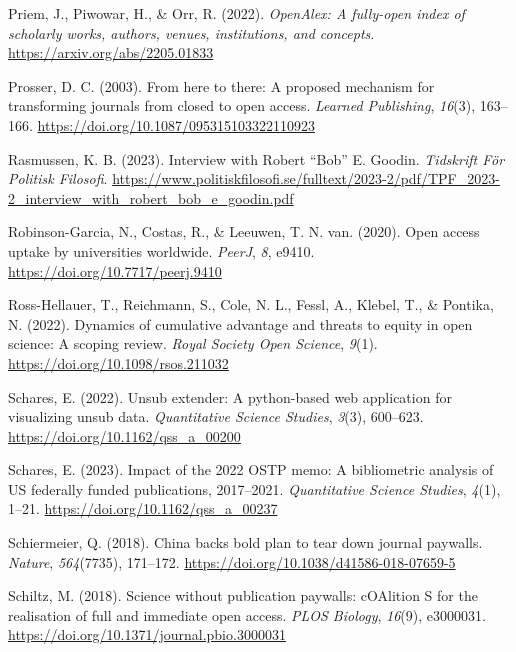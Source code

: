 \documentclass[a4paper,man,floatsintext,longtable,noextraspace,12pt]{apa6}
\newlength{\cslhangindent}
\newenvironment{CSLReferences}[2] %
  {\begin{list}{}{%
   \setlength{\itemindent}{0pt}
   \setlength{\leftmargin}{0pt}
   \setlength{\parsep}{0pt}
   \ifodd #1
    \setlength{\leftmargin}{\cslhangindent}
    \setlength{\itemindent}{-1\cslhangindent}
   \fi
   \setlength{\itemsep}{#2\baselineskip}}}
  {\end{list}}
\begin{document}
\begin{CSLReferences}{1}{0}
Priem, J., Piwowar, H., \& Orr, R. (2022). \emph{OpenAlex: A fully-open
index of scholarly works, authors, venues, institutions, and concepts}.
\url{https://arxiv.org/abs/2205.01833}

Prosser, D. C. (2003). From here to there: A proposed mechanism for
transforming journals from closed to open access. \emph{Learned
Publishing}, \emph{16}(3), 163--166.
\url{https://doi.org/10.1087/095315103322110923}

Rasmussen, K. B. (2023). Interview with {Robert {``Bob''} E. Goodin}.
\emph{Tidskrift För Politisk Filosofi}.
\url{https://www.politiskfilosofi.se/fulltext/2023-2/pdf/TPF_2023-2_interview_with_robert_bob_e_goodin.pdf}

Robinson-Garcia, N., Costas, R., \& Leeuwen, T. N. van. (2020). Open
access uptake by universities worldwide. \emph{{PeerJ}}, \emph{8},
e9410. \url{https://doi.org/10.7717/peerj.9410}

Ross-Hellauer, T., Reichmann, S., Cole, N. L., Fessl, A., Klebel, T., \&
Pontika, N. (2022). Dynamics of cumulative advantage and threats to
equity in open science: A scoping review. \emph{Royal Society Open
Science}, \emph{9}(1). \url{https://doi.org/10.1098/rsos.211032}

Schares, E. (2022). Unsub extender: A python-based web application for
visualizing unsub data. \emph{Quantitative Science Studies},
\emph{3}(3), 600--623. \url{https://doi.org/10.1162/qss_a_00200}

Schares, E. (2023). Impact of the 2022 OSTP memo: A bibliometric
analysis of US federally funded publications, 2017--2021.
\emph{Quantitative Science Studies}, \emph{4}(1), 1--21.
\url{https://doi.org/10.1162/qss_a_00237}

Schiermeier, Q. (2018). China backs bold plan to tear down journal
paywalls. \emph{Nature}, \emph{564}(7735), 171--172.
\url{https://doi.org/10.1038/d41586-018-07659-5}

Schiltz, M. (2018). Science without publication paywalls: {cOAlition S}
for the realisation of full and immediate open access. \emph{PLOS
Biology}, \emph{16}(9), e3000031.
\url{https://doi.org/10.1371/journal.pbio.3000031}


\end{CSLReferences}
\end{document}

